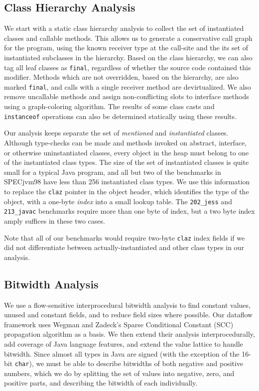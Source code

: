 \documentclass[oribibl]{llncs}
\begin{document}
\subsection{Class Hierarchy Analysis}
We start with a static class hierarchy analysis to collect the set of
instantiated classes and callable methods.  This allows us to generate
a conservative call graph for the program, using the known receiver
type at the call-site and the its set of instantiated subclasses in the
hierarchy.  Based on the class hierarchy, we can also tag all leaf
classes as {\tt final}, regardless of whether the source code contained
this modifier.  Methods which are not overridden, based on
the hierarchy, are also marked {\tt final}, and calls with a single
receiver method are devirtualized.  We also remove uncallable methods
and assign non-conflicting slots to interface methods using a
graph-coloring algorithm.  The results of some class casts and {\tt
  instanceof} operations can also be determined statically using
these results.

Our analysis keeps separate the set of {\it mentioned} and
{\it instantiated} classes.  Although type-checks can be made and methods
invoked on abstract, interface, or otherwise uninstantiated classes,
every object
in the heap must belong to one of the instantiated class types.
The size of the set of instantiated classes is quite small for a
typical Java program, and all but two of the benchmarks in SPECjvm98
have less than 256 instantiated class types.  We use this information
to replace the {\tt claz} pointer in the object header, which
identifies the type of the object, with a one-byte {\it index} into a
small lookup table.  The {\tt 202\_jess} and {\tt 213\_javac}
benchmarks require more than one byte of index, but a two byte index
amply suffices in these two cases.

Note that all of our benchmarks would require two-byte {\tt claz}
index fields if we did not differentiate between actually-instantiated
and other class types in our analysis.


\subsection{Bitwidth Analysis}
We use a flow-sensitive interprocedural bitwidth analysis to
find constant values, unused and constant fields, and to reduce
field sizes where possible.  Our dataflow framework uses
Wegman and Zadeck's Sparse Conditional Constant (SCC) propagation
algorithm \cite{wegman91:scc} as a basis.  We then extend their
analysis interprocedurally, add coverage of Java language features,
and extend the value lattice to handle bitwidth.
Since almost all types in Java are signed (with the exception of the
16-bit {\tt char}), we must be able to describe bitwidths of both
negative and positive numbers, which we do by splitting the set of
values into negative, zero, and positive parts, and describing the
bitwidth of each individually.
\end{document}
